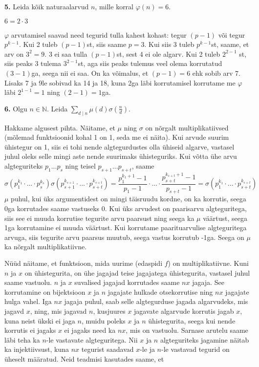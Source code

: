 \documentclass[a4paper, 10pt]{article}
\newcommand{\N}{\mathbb{N}}
\begin{document}
\noindent \textbf{5.} Leida kõik naturaalarvud $n$, mille korral $\varphi(n)=6$. 

\bigskip
$6=2\cdot 3$

$\varphi$ arvutamisel saavad need tegurid tulla kahest kohast: tegur $(p-1)$ või tegur $p^{k-1}$. Kui 2 tuleb $(p-1)$st, siis saame $p=3$. Kui siis 3 tuleb $p^{k-1}$st, saame, et arv on $3^2=9$. 3 ei saa tulla $(p-1)$st, sest 4 ei ole algarv. Kui 2 tuleb $2^{2-1}$ st, siis peaks 3 tulema $3^{2-1}$st, aga siis peaks tulemus veel olema korrutatud $(3-1)$ga, seega nii ei saa. On ka võimalus, et $(p-1)=6$ ehk sobib arv 7. Lisaks 7 ja 9le sobivad ka 14 ja 18, kuna 2ga läbi korrutamisel korrutame me $\varphi$ läbi $2^{1-1}=1$ ning $(2-1)=1$ga.
\bigskip

\noindent \textbf{6.} Olgu $n\in\N$. Leida $\sum\limits_{d\mid n}\mu(d)\sigma(\frac{n}{d})$. 

\bigskip
Hakkame algusest pihta. Näitame, et $\mu$ ning $\sigma$ on nõrgalt multiplikatiivsed (mõlemad funktsioonid kohal 1 on 1, seda me ei näita). Kui arvude suurim ühistegur on 1, siis ei tohi nende algtegurdustes olla ühiseid algarve, vastasel juhul oleks selle mingi aste nende suurimaks ühisteguriks. Kui võtta ühe arvu algteguriteks $p_1 ...p_s$ ning teisel $p_{s+1}...p_{s+t}$, saame 
\begin{equation*}
    \sigma(p_1^{k_1}\cdot ...\cdot p_s^{k_s})\sigma(p_{s+1}^{k_{s+1}}\cdot ...\cdot p_{s+t}^{k_{s+t}})=\frac{p_1^{k_1+1}-1}{p_1-1}\cdot ... \cdot \frac{p_{s+t}^{k_{s+t}+1}-1}{p_{s+t}-1}=\sigma(p_1^{k_1}\cdot ... \cdot p_{s+t}^{k_{s+t}})
\end{equation*}
$\mu$ puhul, kui üks argumentidest on mingi täisruudu kordne, on ka korrutis, seega 0ga korrutades saame vastuseks 0. Kui üks arvudest on paarisarvu algteguritega, siis see ei muuda korrutise tegurite arvu paarsust ning seega ka $\mu$ väärtust, seega 1ga korrutamine ei muuda väärtust. Kui korrutame paarituarvulise algteguritega arvuga, siis tegurite arvu paarsus muutub, seega vastus korrutub -1ga. Seega on $\mu$ ka nõrgalt multiplikatiivne.

Nüüd näitame, et funktsioon, mida uurime (edaspidi $f$) on multiplikatiivne.
Kuni $n$ ja $x$ on ühistegurita, on ühe jagajad teise jagajatega ühistegurita, vastasel juhul saame vastuolu. $n$ ja $x$ suvalised jagajad korrutades saame $nx$ jagaja. See korrutamine on bijektsioon $x$ ja $n$ jagajate hulkade otsekorrutise ning $nx$ jagajate hulga vahel. Iga $nx$ jagaja puhul, saab selle algtegurduse jagada algarvudeks, mis jagavd $x$, ning, mis jagavad $n$, kusjuures $x$ jagavate algarvude korrutis jagab $x$, kuna neist ükski ei jaga $n$, muidu poleks $x$ ja $n$ ühistegurita, seega kui nende korrutis ei jagaks $x$ ei jagaks need ka $nx$, mis on vastuolu. Sarnase arutelu saame läbi teha ka $n$-le vastavate algteguritega. Nii $x$ ja $n$ algteguriteks jagamine näitab ka injektiivsust, kuna $nx$ tegurist saadavad $x$-le ja $n$-le vastavad tegurid on üheselt määratud. Neid teadmisi kasutades saame, et 
\end{document}
